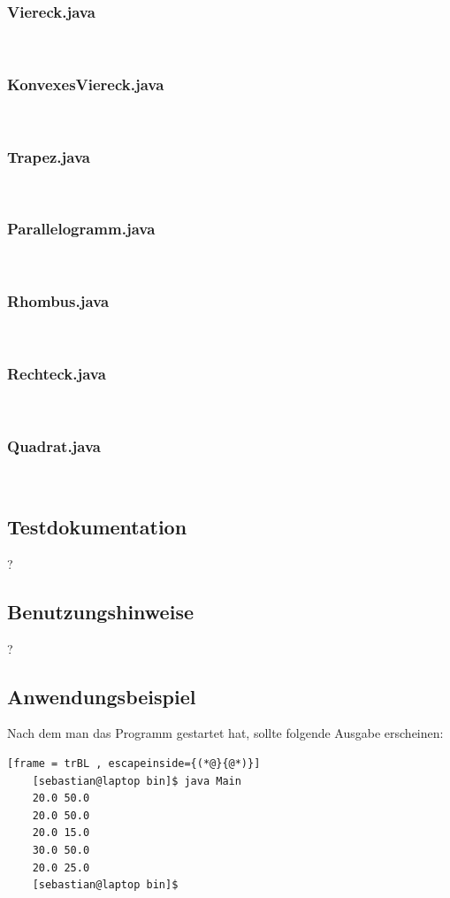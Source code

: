 \subsubsection{Viereck.java}\

\subsubsection{KonvexesViereck.java}\

\subsubsection{Trapez.java}\

\subsubsection{Parallelogramm.java}\

\subsubsection{Rhombus.java}\

\subsubsection{Rechteck.java}\

\subsubsection{Quadrat.java}\


\subsection{Testdokumentation}
?

\subsection{Benutzungshinweise}
?

\subsection{Anwendungsbeispiel}
Nach dem man das Programm gestartet hat, sollte folgende Ausgabe erscheinen:
\begin{lstlisting}[frame = trBL , escapeinside={(*@}{@*)}]
	[sebastian@laptop bin]$ java Main
	20.0 50.0
	20.0 50.0
	20.0 15.0
	30.0 50.0
	20.0 25.0
	[sebastian@laptop bin]$ 
\end{lstlisting}